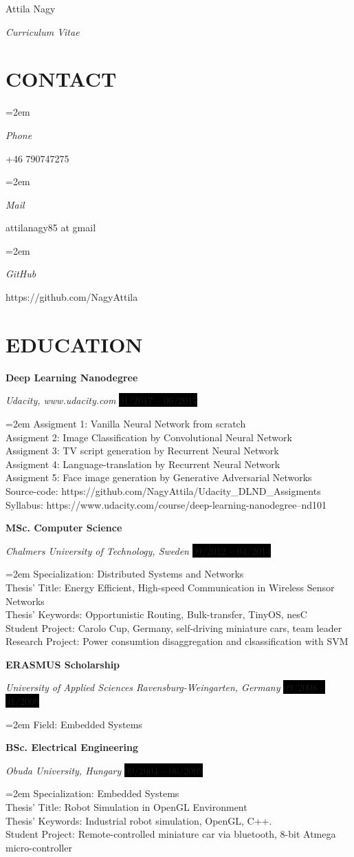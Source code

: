 \documentclass[paper=a4,fontsize=11pt]{scrartcl}	 			%
\newlength{\spacebox}
\newcommand{\sepspace}{\vspace*{1em}}			%
\newcommand{\MyName}[1]{
		\Huge \usefont{OT1}{phv}{b}{n} \hfill #1 		%
		\par \normalsize \normalfont}
\newcommand{\MySlogan}[1]{
		\large \usefont{OT1}{phv}{m}{n}\hfill \textit{#1} %
		\par \normalsize \normalfont}
\newcommand{\NewPart}[1]{\section*{\uppercase{#1}}}
\newcommand{\PersonalEntry}[2]{
		\noindent\hangindent=2em\hangafter=0 		%
		\parbox{\spacebox}{						%
		\textit{#1}}								%
		\hspace{1.5em} #2 \par}					%
\newcommand{\EducationEntry}[4]{
		\noindent \textbf{#1} \par 					%
		\noindent \textit{#3} \hfill					%
		\colorbox{Black}{%
			\hfill\color{White}#2} \par				%
		\noindent\hangindent=2em\hangafter=0 \small #4 	%
		\normalsize \par
    }
\begin{document}
\MyName{Attila Nagy}
\MySlogan{Curriculum Vitae}

\NewPart{Contact}{}

\PersonalEntry{Phone}{+46 790747275}
\PersonalEntry{Mail}{attilanagy85 at gmail}
\PersonalEntry{GitHub}{https://github.com/NagyAttila}

\NewPart{Education}{}

\EducationEntry{Deep Learning Nanodegree}{01/2017 -- 06/2017}
{Udacity, www.udacity.com} {Assigment 1: Vanilla Neural Network from scratch\\
 Assigment 2: Image Classification by Convolutional Neural Network\\
 Assigment 3: TV script generation by Recurrent Neural Network\\
 Assigment 4: Language-translation by Recurrent Neural Network\\
 Assigment 5: Face image generation by Generative Adversarial Networks \\
 Source-code: https://github.com/NagyAttila/Udacity\_DLND\_Assigments \\
 Syllabus: https://www.udacity.com/course/deep-learning-nanodegree--nd101 }
\sepspace


\EducationEntry{MSc. Computer Science}{09/2012 -- 04/2014}
  {Chalmers University of Technology, Sweden}{Specialization: Distributed Systems and Networks\\
  Thesis' Title: Energy Efficient, High-speed Communication in Wireless Sensor Networks\\
  Thesis' Keywords: Opportunistic Routing, Bulk-transfer, TinyOS, nesC\\
  Student Project: Carolo Cup, Germany, self-driving miniature cars, team leader\\
  Research Project: Power consumtion disaggregation and clsassification with SVM}
\sepspace

\EducationEntry{ERASMUS Scholarship}{09/2008 -- 01/2009}
{University of Applied Sciences Ravensburg-Weingarten, Germany}
{Field: Embedded Systems }
\sepspace

\EducationEntry{BSc. Electrical Engineering}{09/2004 -- 06/2009}{Obuda University, Hungary}{Specialization: Embedded Systems\\
Thesis' Title: Robot Simulation in OpenGL Environment\\
Thesis' Keywords: Industrial robot simulation, OpenGL, C++. \\
Student Project: Remote-controlled miniature car via bluetooth, 8-bit Atmega micro-controller}
\end{document}
